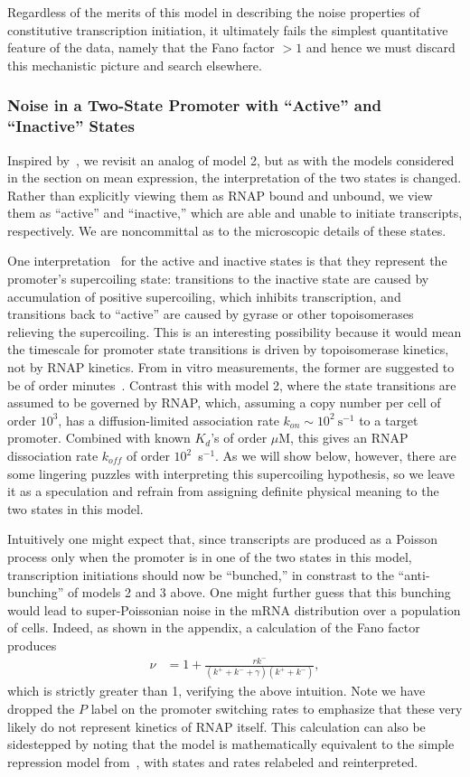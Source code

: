 Regardless of the merits of this model in describing the noise properties of
constitutive transcription initiation, it ultimately fails the simplest quantitative
feature of the data, namely that the Fano factor $> 1$ and hence  we must discard this
mechanistic picture
 and search elsewhere.

\subsubsection{Noise in a Two-State Promoter with ``Active'' and ``Inactive''
States}
 Inspired by~\cite{Razo-Mejia2020}, we revisit an analog of model 2, but as with
 the models considered in the section on mean expression,
the interpretation of the two states is changed. Rather than explicitly viewing
them as RNAP bound and unbound, we view them as ``active'' and ``inactive,''
which are able and unable to initiate transcripts, respectively. We are
noncommittal as to the microscopic details of these states.

One interpretation~\cite{Chong2014, Sevier2016} for the active and inactive
states is that they represent the promoter's supercoiling state: transitions to
the inactive state are caused by accumulation of positive supercoiling, which
inhibits transcription, and transitions back to ``active'' are caused by gyrase
or other topoisomerases relieving the supercoiling. This is an interesting
possibility because it would mean the timescale for promoter state transitions
is driven by topoisomerase kinetics, not by RNAP kinetics. From in vitro
measurements, the former are suggested to be of order minutes~\cite{Chong2014}.
Contrast this with model 2, where the state transitions are assumed to be
governed by RNAP, which, assuming a copy number per cell of order $10^3$, has a
diffusion-limited association rate $k_{on} \sim 10^2~\text{s}^{-1}$ to a target
promoter. Combined with known $K_d$'s of order $\mu$M, this gives an RNAP
dissociation rate $k_{off}$ of order $10^2$~s$^{-1}$. As we will show below, however,
there are some lingering puzzles with interpreting this supercoiling
hypothesis, so we leave it as a speculation and refrain from assigning
definite physical meaning to the two states in this model.

Intuitively one might expect that, since transcripts are produced as a Poisson
process only when the promoter is in one of the two states in this model,
transcription initiations should now be ``bunched,'' in constrast to the
``anti-bunching'' of models 2 and 3 above. One might further guess that this
bunching would lead to super-Poissonian noise in the mRNA distribution over a
population of cells.  Indeed, as shown in the appendix, a calculation of the Fano factor produces
\begin{align}
\nu &= 1 + \frac{r k^-}{(k^+ + k^- + \gamma)(k^+ + k^-)},
\end{align}
which is strictly greater than 1, verifying the above intuition. Note we have
dropped the $P$ label on the promoter switching rates to emphasize that these
very likely do not represent kinetics of RNAP itself. This calculation can also
be sidestepped by noting that the model is mathematically equivalent to the
simple repression model from~\cite{Jones2014}, with states and rates
relabeled and reinterpreted.


